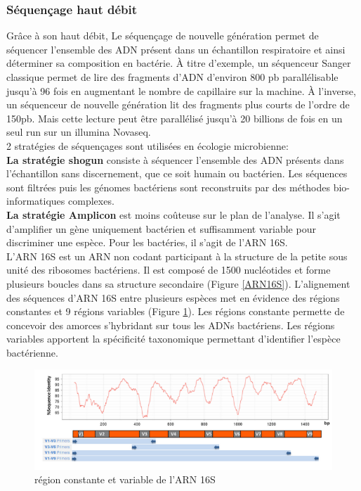 \documentclass[12pt,a4paper]{article}
\begin{document}
\subsubsection{Séquençage haut débit}
Grâce à son haut débit, Le séquençage de nouvelle génération permet de séquencer l'ensemble des ADN présent dans un échantillon respiratoire et ainsi déterminer sa composition en bactérie. À titre d'exemple, un séquenceur Sanger classique permet de lire des fragments d'ADN d'environ 800 pb parallélisable jusqu'à 96 fois en augmentant le nombre de capillaire sur la machine. 
À l'inverse, un séquenceur de nouvelle génération lit des fragments plus courts de l'ordre de 150pb. Mais cette lecture peut être parallélisé jusqu'à 20 billions de fois en un seul run sur un illumina Novaseq. \\
2 stratégies de séquençages sont utilisées en écologie microbienne:  \\
\textbf{La stratégie shogun} consiste à séquencer l'ensemble des  ADN présents dans l'échantillon sans discernement, que ce soit humain ou bactérien. Les séquences sont filtrées puis les génomes bactériens sont reconstruits par des méthodes bio-informatiques complexes. \\
\textbf{La stratégie Amplicon} est moins coûteuse sur le plan de l'analyse. Il s'agit d'amplifier un gène uniquement bactérien et suffisamment variable pour discriminer une espèce. Pour les bactéries, il s'agit de l'ARN 16S.\\
L'ARN 16S est un ARN non codant participant à la structure de la petite sous unité des ribosomes bactériens. Il est composé de 1500 nucléotides et forme plusieurs boucles dans sa structure secondaire (Figure \ref{ARN16S}). 
L'alignement des séquences d'ARN 16S entre plusieurs espèces met en évidence des régions constantes et 9 régions variables (Figure \ref{ARN16SVariation}). Les régions constante permette de concevoir des amorces s'hybridant sur tous les ADNs bactériens. Les régions variables apportent la spécificité taxonomique permettant d'identifier l'espèce bactérienne.

\begin{figure}[ht]
\begin{center}
\includegraphics[scale=0.8]{img/ARN16S_variation.png}\hfill
\end{center}
\caption{région constante et variable de l'ARN 16S}
\label{ARN16SVariation}
\end{figure}
\end{document}
